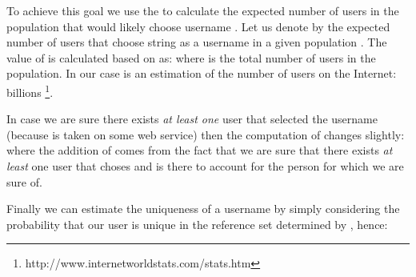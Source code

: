 \documentclass[letterpaper]{sig-alternate}
\begin{document}
To achieve this goal we use the  to calculate the expected
number of users in the population that would likely choose username .
Let us denote by  the expected number of users that choose string
 as a username in a given population .
The value of  is calculated based on  as:  \noindent where  is the total number of users in the population.
In our case  is an estimation of the number of users on the Internet:  billions \footnote{
http://www.internetworldstats.com/stats.htm}.

In case we are sure there exists {\em at least one} user that selected the username 
(because  is taken on some web service) then the computation of  changes slightly:
 \noindent where the addition of  comes from the fact that
we are sure that there exists {\em at least} one user that choses  and  is there to account
for the person for which we are sure of.

Finally we can estimate the uniqueness of a username  by simply considering
the probability that our user is unique in the reference set determined by , hence:
 
\end{document}
